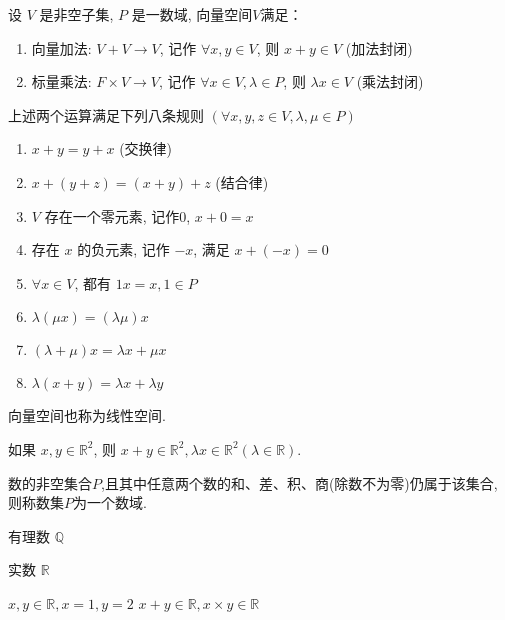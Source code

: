 \begin{definition}[向量空间$V$]
    设 \( V \) 是非空子集, \( P \) 是一数域, 向量空间$V$满足：

    \begin{enumerate}
        \item 向量加法: \( V+V \rightarrow V \), 记作 \( \forall x, y \in V \), 则 \( x+y \in V \) (加法封闭)
        \item 标量乘法: \( F \times V \rightarrow V \), 记作 \( \forall x \in V, \lambda \in P \), 则 \( \lambda x \in V \) (乘法封闭)
    \end{enumerate}

上述两个运算满足下列八条规则 \( (\forall x, y, z \in V, \lambda, \mu \in P) \) 
\begin{enumerate}
    \item \( x+y=y+x \) (交换律) 
    \item \( x+(y+z)=(x+y)+z \) (结合律)
    \item \( V \) 存在一个零元素, 记作0, \( x+0=x \)
    \item 存在 \( x \) 的负元素, 记作 \( -x \), 满足 \( x+(-x)=0 \)
    \item \( \forall x \in V \), 都有 \( 1 x=x, 1 \in P \)
    \item \( \lambda(\mu x)=(\lambda \mu) x \)
    \item \( (\lambda+\mu) x=\lambda x+\mu x \)
    \item \(  \lambda(x+y)=\lambda x+\lambda y \)
\end{enumerate}
\end{definition}

\begin{corollary}
    向量空间也称为线性空间.
\end{corollary}

\begin{corollary}
    如果 \( x, y \in \mathbb{R}^{2} \), 则 \( x+y \in \mathbb{R}^{2}, \lambda x \in \mathbb{R}^{2}(\lambda \in \mathbb{R}) \).
\end{corollary}

\begin{definition}[数域]
    数的非空集合$P$,且其中任意两个数的和、差、积、商(除数不为零)仍属于该集合, 则称数集$P$为一个数域. 
\end{definition}

\begin{example}
    有理数 $ \mathbb{Q} $
\end{example}

\begin{example}
    实数 $ \mathbb{R} $

    $ x, y \in \mathbb{R}, x=1, y=2 $
    $ x+y \in \mathbb{R}  ,x \times y \in \mathbb{R} $
\end{example}

